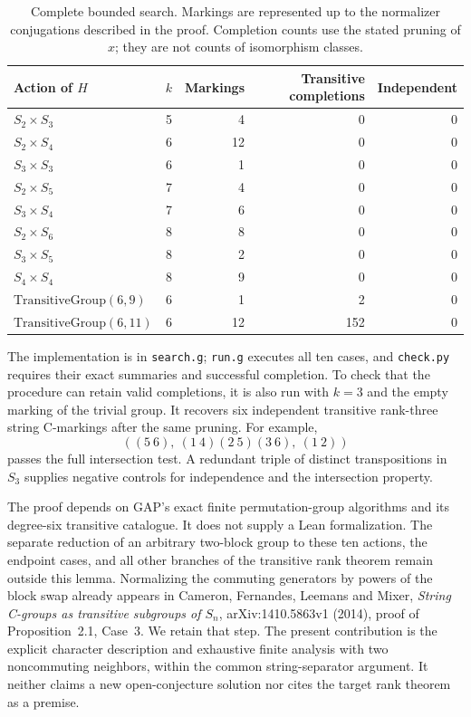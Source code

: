 \documentclass[11pt]{article}
\begin{document}
\begin{table}[ht]
\centering
\begin{tabular}{lrrrr}
\toprule
Action of $H$ & $k$ & Markings & Transitive completions & Independent\\
\midrule
$S_2\times S_3$ &5&4&0&0\\
$S_2\times S_4$ &6&12&0&0\\
$S_3\times S_3$ &6&1&0&0\\
$S_2\times S_5$ &7&4&0&0\\
$S_3\times S_4$ &7&6&0&0\\
$S_2\times S_6$ &8&8&0&0\\
$S_3\times S_5$ &8&2&0&0\\
$S_4\times S_4$ &8&9&0&0\\
$\mathrm{TransitiveGroup}(6,9)$ &6&1&2&0\\
$\mathrm{TransitiveGroup}(6,11)$ &6&12&152&0\\
\bottomrule
\end{tabular}
\caption{Complete bounded search. Markings are represented up to the
normalizer conjugations described in the proof. Completion counts
use the stated pruning of $x$; they are not counts of isomorphism classes.}
\end{table}

The implementation is in \texttt{search.g}; \texttt{run.g} executes
all ten cases, and \texttt{check.py} requires their exact summaries
and successful completion. To check that the procedure can retain
valid completions, it is also run with $k=3$ and the empty marking
of the trivial group. It recovers six independent transitive
rank-three string C-markings after the same pruning. For example,
\[
       ((5\ 6),\ (1\ 4)(2\ 5)(3\ 6),\ (1\ 2))
\]
passes the full intersection test. A redundant triple of distinct
transpositions in $S_3$ supplies negative controls for independence
and the intersection property.

The proof depends on GAP's exact finite permutation-group algorithms
and its degree-six transitive catalogue. It does not supply a Lean
formalization. The separate reduction of an arbitrary two-block
group to these ten actions, the endpoint cases, and all other
branches of the transitive rank theorem remain outside this lemma.
Normalizing the commuting generators by powers of the block swap
already appears in Cameron, Fernandes, Leemans and Mixer,
\emph{String C-groups as transitive subgroups of $S_n$},
arXiv:1410.5863v1 (2014), proof of Proposition~2.1, Case~3.
We retain that step. The present contribution is the explicit
character description and exhaustive finite analysis with two
noncommuting neighbors, within the common string-separator argument.
It neither claims a new open-conjecture solution nor cites the
target rank theorem as a premise.
\end{document}
